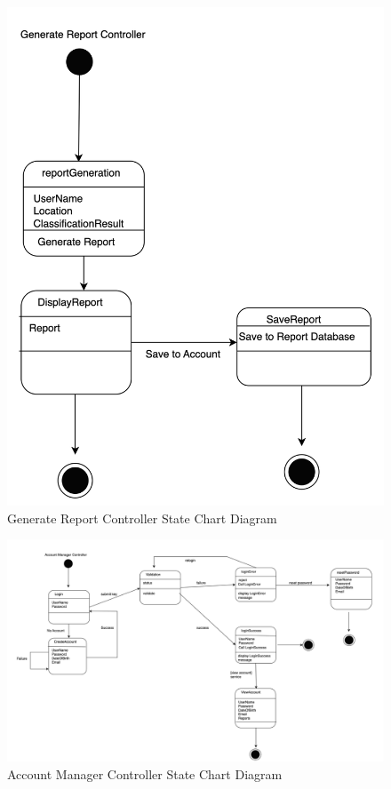 \documentclass[]{article}
\numberwithin{figure}{section}
\begin{document}
\begin{figure}[h]
    \centering
    \includegraphics[scale=0.7]{GenerateReport.png}
    \caption{Generate Report Controller State Chart Diagram}
    \label{fig:generate_report_controller}
\end{figure}
\clearpage 
\begin{figure}[h]
    \centering
    \includegraphics[scale=0.4]{AccountManager.png}
    \caption{Account Manager Controller State Chart Diagram}
    \label{fig:account_manager_controller}
\end{figure}
\end{document}
